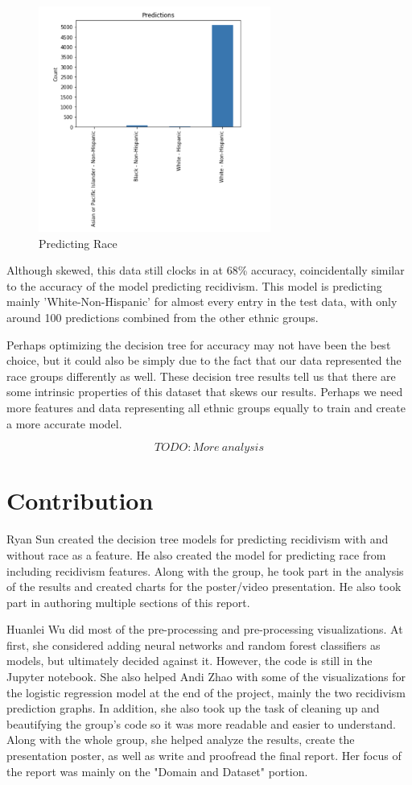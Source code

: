 \documentclass[11pt, sigconf]{acmart}
\begin{document}
\begin{figure}[h] 	
\centering
\includegraphics[width=3in]{4.png}
\caption{Predicting Race}
\end{figure}

Although skewed, this data still clocks in at 68\% accuracy, coincidentally similar to the accuracy of the model predicting recidivism. 
This model is predicting mainly 'White-Non-Hispanic' for almost every entry in the test data, with only around 100 predictions combined from the other ethnic groups. 

Perhaps optimizing the decision tree for accuracy may not have been the best choice, but it could also be simply due to the fact that our data represented the race groups differently as well. These decision tree results tell us that there are some intrinsic properties of this dataset that skews our results. Perhaps we need more features and data representing all ethnic groups equally to train and create a more accurate model. 

$$TODO: More~analysis $$

\section{Contribution}

\hspace{5mm}Ryan Sun created the decision tree models for predicting recidivism with and without race as a feature. He also created the model for predicting race from including recidivism features. Along with the group, he took part in the analysis of the results and created charts for the poster/video presentation. He also took part in authoring multiple sections of this report. 

Huanlei Wu did most of the pre-processing and pre-processing visualizations. At first, she considered adding neural networks and random forest classifiers as models, but ultimately decided against it. However, the code is still in the Jupyter notebook. She also helped Andi Zhao with some of the visualizations for the logistic regression model at the end of the project, mainly the two recidivism prediction graphs. In addition, she also took up the task of cleaning up and beautifying the group's code so it was more readable and easier to understand. Along with the whole group, she helped analyze the results, create the presentation poster, as well as write and proofread the final report. Her focus of the report was mainly on the "Domain and Dataset" portion. 
\end{document}
